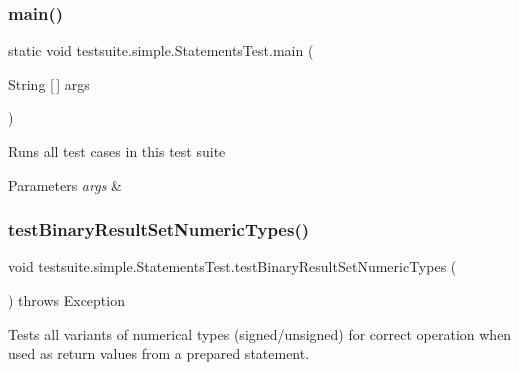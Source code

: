 \subsubsection{\texorpdfstring{main()}{main()}}
{\footnotesize\ttfamily static void testsuite.\+simple.\+Statements\+Test.\+main (\begin{DoxyParamCaption}\item[{String \mbox{[}$\,$\mbox{]}}]{args }\end{DoxyParamCaption})\hspace{0.3cm}{\ttfamily [static]}}

Runs all test cases in this test suite


\begin{DoxyParams}{Parameters}
{\em args} & \\
\hline
\end{DoxyParams}
\mbox{\label{classtestsuite_1_1simple_1_1_statements_test_a8686a9137f5901a701020342f04dc3a7}} 
\subsubsection{\texorpdfstring{test\+Binary\+Result\+Set\+Numeric\+Types()}{testBinaryResultSetNumericTypes()}}
{\footnotesize\ttfamily void testsuite.\+simple.\+Statements\+Test.\+test\+Binary\+Result\+Set\+Numeric\+Types (\begin{DoxyParamCaption}{ }\end{DoxyParamCaption}) throws Exception}

Tests all variants of numerical types (signed/unsigned) for correct operation when used as return values from a prepared statement.


